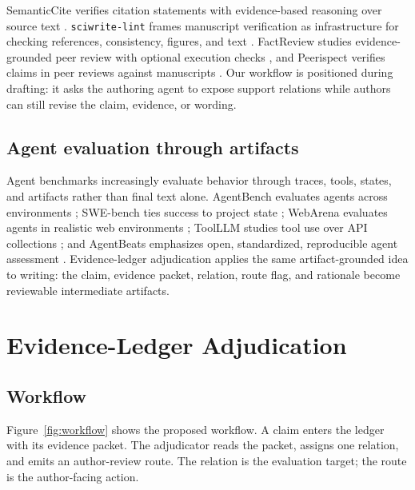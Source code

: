 \documentclass[11pt]{article}
\begin{document}
SemanticCite verifies citation statements with evidence-based reasoning over source text \citep{Haan2025SemanticCite}. \texttt{sciwrite-lint} frames manuscript verification as infrastructure for checking references, consistency, figures, and text \citep{Samsonau2026SciwriteLint}. FactReview studies evidence-grounded peer review with optional execution checks \citep{Yue2026FactReview}, and Peerispect verifies claims in peer reviews against manuscripts \citep{Ghorbanpour2026Peerispect}. Our workflow is positioned during drafting: it asks the authoring agent to expose support relations while authors can still revise the claim, evidence, or wording.

\subsection{Agent evaluation through artifacts}

Agent benchmarks increasingly evaluate behavior through traces, tools, states, and artifacts rather than final text alone. AgentBench evaluates agents across environments \citep{Liu2023AgentBench}; SWE-bench ties success to project state \citep{Jimenez2023bench}; WebArena evaluates agents in realistic web environments \citep{Zhou2023WebArena}; ToolLLM studies tool use over API collections \citep{Qin2023ToolLLM}; and AgentBeats emphasizes open, standardized, reproducible agent assessment \citep{Liu2026AgentBeats}. Evidence-ledger adjudication applies the same artifact-grounded idea to writing: the claim, evidence packet, relation, route flag, and rationale become reviewable intermediate artifacts.

\section{Evidence-Ledger Adjudication}

\subsection{Workflow}

Figure~\ref{fig:workflow} shows the proposed workflow. A claim enters the ledger with its evidence packet. The adjudicator reads the packet, assigns one relation, and emits an author-review route. The relation is the evaluation target; the route is the author-facing action.
\end{document}
